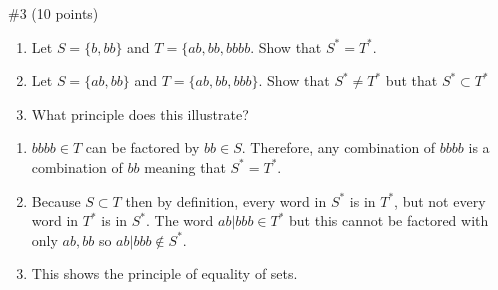 \begin{problem}{\#3 (10 points)}
    \begin{enumerate}[label=\alph*)]
        \item Let \(S=\{b,bb\}\) and \(T=\{ab,bb,bbbb\).
        Show that \(S^* = T^*\).
        \item Let \(S=\{ab,bb\}\) and \(T=\{ab,bb,bbb\}\).
        Show that \(S^* \neq T^*\) but that \(S^* \subset T^*\)
        \item What principle does this illustrate?
    \end{enumerate}
\end{problem}
\vspace{2em}
\begin{solution}
    \begin{enumerate}
        \item \(bbbb \in T\) can be factored by \(bb \in S\).
        Therefore, any combination of \(bbbb\) is a combination of \(bb\) meaning that \(S^* = T^*\).
        \item Because \(S \subset T\) then by definition, every word in \(S^*\) is in \(T^*\), but not every word in \(T^*\) is in \(S^*\).
        The word \(ab|bbb \in T^*\) but this cannot be factored with only \(ab,bb\) so \(ab|bbb \notin S^*\).
        \item This shows the principle of equality of sets.
    \end{enumerate}
\end{solution}

